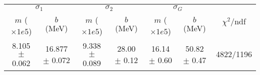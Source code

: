 \begin{tabular}{cc|cc|cc||c}
\multicolumn{2}{c|}{$\sigma_1$} & \multicolumn{2}{|c}{$\sigma_2$} & \multicolumn{2}{|c}{$\sigma_G$}  & \multirow{2}{*}{$\chi^2/$ndf}\\
$m$ ($\times1e5$) & $b$ (MeV) & $m$ ($\times1e5$) & $b$ (MeV) & $m$ ($\times1e5$) & $b$ (MeV) & \\
\hline
8.105 $\pm$ 0.062 & 16.877 $\pm$ 0.072 & 9.338 $\pm$ 0.089 & 28.00 $\pm$ 0.12 & 16.14 $\pm$ 0.60 & 50.82 $\pm$ 0.47 & 4822/1196\\
\end{tabular}
